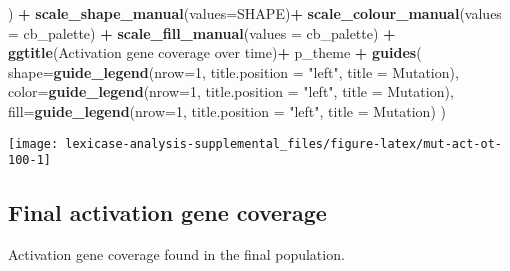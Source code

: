 \documentclass[
]{book}
\newenvironment{Shaded}{\begin{snugshade}}{\end{snugshade}}
\newcommand{\AttributeTok}[1]{\textcolor[rgb]{0.13,0.29,0.53}{#1}}
\newcommand{\DecValTok}[1]{\textcolor[rgb]{0.00,0.00,0.81}{#1}}
\newcommand{\FunctionTok}[1]{\textcolor[rgb]{0.13,0.29,0.53}{\textbf{#1}}}
\newcommand{\NormalTok}[1]{#1}
\newcommand{\SpecialCharTok}[1]{\textcolor[rgb]{0.81,0.36,0.00}{\textbf{#1}}}
\newcommand{\StringTok}[1]{\textcolor[rgb]{0.31,0.60,0.02}{#1}}
\begin{document}
\begin{Shaded}
\begin{Highlighting}[]
\NormalTok{  ) }\SpecialCharTok{+}
  \FunctionTok{scale\_shape\_manual}\NormalTok{(}\AttributeTok{values=}\NormalTok{SHAPE)}\SpecialCharTok{+}
  \FunctionTok{scale\_colour\_manual}\NormalTok{(}\AttributeTok{values =}\NormalTok{ cb\_palette) }\SpecialCharTok{+}
  \FunctionTok{scale\_fill\_manual}\NormalTok{(}\AttributeTok{values =}\NormalTok{ cb\_palette) }\SpecialCharTok{+}
  \FunctionTok{ggtitle}\NormalTok{(}\StringTok{\textquotesingle{}Activation gene coverage over time\textquotesingle{}}\NormalTok{)}\SpecialCharTok{+}
\NormalTok{  p\_theme }\SpecialCharTok{+}
  \FunctionTok{guides}\NormalTok{(}
    \AttributeTok{shape=}\FunctionTok{guide\_legend}\NormalTok{(}\AttributeTok{nrow=}\DecValTok{1}\NormalTok{, }\AttributeTok{title.position =} \StringTok{"left"}\NormalTok{, }\AttributeTok{title =} \StringTok{\textquotesingle{}Mutation\textquotesingle{}}\NormalTok{),}
    \AttributeTok{color=}\FunctionTok{guide\_legend}\NormalTok{(}\AttributeTok{nrow=}\DecValTok{1}\NormalTok{, }\AttributeTok{title.position =} \StringTok{"left"}\NormalTok{, }\AttributeTok{title =} \StringTok{\textquotesingle{}Mutation\textquotesingle{}}\NormalTok{),}
    \AttributeTok{fill=}\FunctionTok{guide\_legend}\NormalTok{(}\AttributeTok{nrow=}\DecValTok{1}\NormalTok{, }\AttributeTok{title.position =} \StringTok{"left"}\NormalTok{, }\AttributeTok{title =} \StringTok{\textquotesingle{}Mutation\textquotesingle{}}\NormalTok{)}
\NormalTok{  )}
\end{Highlighting}
\end{Shaded}

\texttt{[image: lexicase-analysis-supplemental\_files/figure-latex/mut-act-ot-100-1]}

\hypertarget{final-activation-gene-coverage}{%
\subsection{Final activation gene coverage}\label{final-activation-gene-coverage}}

Activation gene coverage found in the final population.
\end{document}
